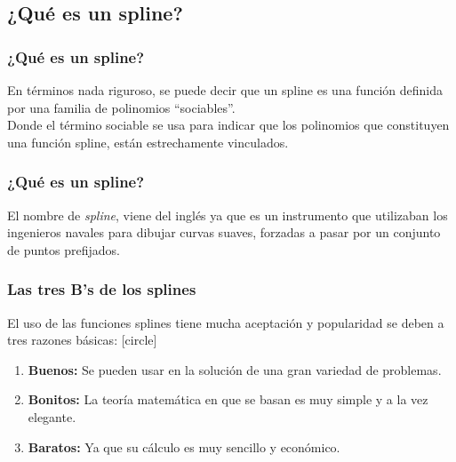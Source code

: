 {\subsection{¿Qué es un spline?}
\begin{frame}
\frametitle{¿Qué es un spline?}
En términos nada riguroso, se puede decir que un spline es una función definida por una familia de polinomios \enquote{sociables}.
\\
\bigskip
Donde el término sociable se usa para indicar que los polinomios que constituyen una función spline, están estrechamente vinculados.
\end{frame}
\begin{frame}
\frametitle{¿Qué es un spline?}
El nombre de \emph{spline}, viene del inglés ya que es un instrumento que utilizaban los ingenieros navales para dibujar curvas suaves, forzadas a pasar por un conjunto de puntos prefijados.
\end{frame}
\begin{frame}
\frametitle{Las tres B's de los splines}
El uso de las funciones splines tiene mucha aceptación y popularidad se deben a tres razones básicas:
[circle]
\begin{enumerate}[<+->]
\item \textbf{Buenos:} Se  pueden usar en la solución de una gran variedad de problemas.
\item \textbf{Bonitos:} La teoría matemática en que se basan es muy simple y a la vez elegante.
\item \textbf{Baratos:} Ya que su cálculo es muy sencillo y económico.
\end{enumerate}
\end{frame}
}
